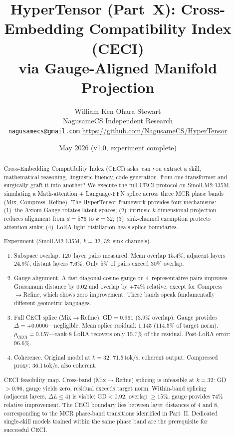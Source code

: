 \documentclass[11pt]{article}
\title{HyperTensor (Part~X): Cross-Embedding Compatibility Index (CECI)\\via Gauge-Aligned Manifold Projection}
\author{William Ken Ohara Stewart\\
\small NagusameCS Independent Research\\
\small \texttt{nagusamecs@gmail.com} \quad \url{https://github.com/NagusameCS/HyperTensor}}
\date{May 2026 (v1.0, experiment complete)}
\begin{document}
\maketitle
\hypertensorbanner

\begin{abstract}
\noindent
Cross-Embedding Compatibility Index (CECI) asks: can you extract a
skill, mathematical reasoning, linguistic fluency, code
generation, from one transformer and surgically graft it into another?
We execute the full CECI protocol on SmolLM2-135M, simulating a
Math-attention + Language-FFN splice across three MCR phase bands
(Mix, Compress, Refine). The HyperTensor framework provides four
mechanisms: (1)~the Axiom Gauge rotates latent spaces; (2)~intrinsic
$k$-dimensional projection reduces alignment from $d{=}576$ to
$k{=}32$; (3)~sink-channel exemption protects attention sinks;
(4)~LoRA light-distillation heals splice boundaries.

Experiment (SmolLM2-135M, $k=32$, 32~sink channels).
\begin{enumerate}
\item Subspace overlap. 120~layer pairs measured. Mean
 overlap $15.4\%$; adjacent layers $24.9\%$; distant layers
 $7.6\%$. Only $5\%$ of pairs exceed $30\%$ overlap.
\item Gauge alignment. A fast diagonal-cosine gauge on
 4~representative pairs improves Grassmann distance by $0.02$
 and overlap by $+74\%$ relative, except for
 Compress$\to$Refine, which shows zero improvement.
 These bands speak fundamentally different geometric languages.
\item Full CECI splice (Mix$\to$Refine). GD$=0.961$
 (3.9\% overlap). Gauge provides $\Delta{=}{+}0.0006$---negligible.
 Mean splice residual: 1.145 (114.5\% of target norm).
 $\rho_{\mathrm{CECI}}{=}0.157$---rank-8 LoRA recovers only
 15.7\% of the residual. Post-LoRA error: 96.6\%.
\item Coherence. Original model at $k{=}32$: 71.5\,tok/s,
 coherent output. Compressed proxy: 36.1\,tok/s, also coherent.
\end{enumerate}

CECI feasibility map. Cross-band (Mix$\to$Refine) splicing
is infeasible at $k=32$: GD$>$0.96, gauge yields zero,
residual exceeds target norm. Within-band splicing (adjacent
layers, $\Delta L{\le}4$) is viable: GD${<}0.92$, overlap
${\ge}15\%$, gauge provides $74\%$ relative improvement. The CECI
boundary lies between layer distances of 4 and 8, corresponding to
the MCR phase-band transitions identified in Part~II. Dedicated
single-skill models trained within the same phase band are the
prerequisite for successful CECI.
\end{abstract}
\end{document}
